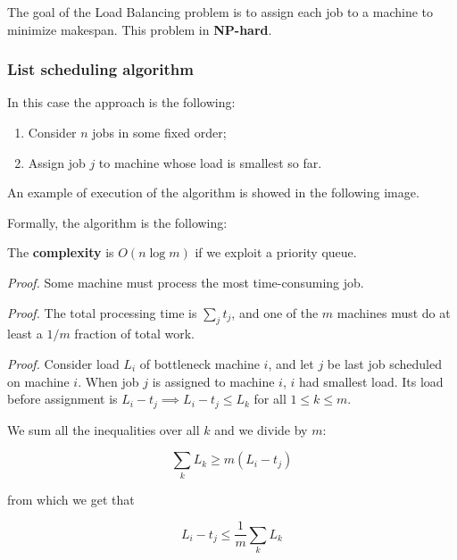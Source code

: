 The goal of the Load Balancing problem is to assign each job to a machine to minimize makespan. This problem in \textbf{NP-hard}.

\subsubsection{List scheduling algorithm}
In this case the approach is the following:

\begin{enumerate}
    \item Consider $n$ jobs in some fixed order;
    \item Assign job $j$ to machine whose load is smallest so far.
\end{enumerate}

An example of execution of the algorithm is showed in the following image.


Formally, the algorithm is the following:


The \textbf{complexity} is $O(n \log m)$ if we exploit a priority queue.


\textit{Proof.} Some machine must process the most time-consuming job. 


\textit{Proof.} The total processing time is  $\sum_j t_j$, and one of the $m$ machines must do at least a $1/m$ fraction of total work.


\textit{Proof.} Consider load $L_i$ of bottleneck machine $i$, and let $j$ be last job scheduled on machine $i$. When job $j$ is assigned to machine $i$, $i$ had smallest load. Its load before assignment is $L_i - t_j \implies L_i - t_j \leq L_k$ for all $1 \leq k \leq m$.


We sum all the inequalities over all $k$ and we divide by $m$:

$$
\sum_k L_k \geq m(L_i - t_j)
$$

from which we get that

$$
L_i - t_j \leq \frac{1}{m} \sum_k L_k
$$

